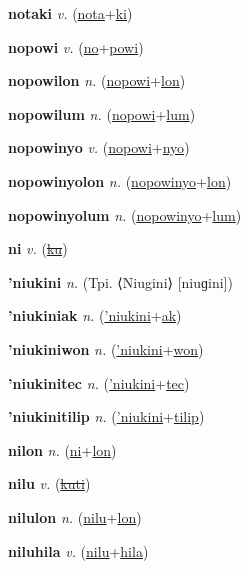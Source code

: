 \textbf{\hypertarget{notaki}{notaki}} \textit{v.} (\hyperlink{nota}{nota}+\allowbreak \hyperlink{ki}{ki})


\textbf{\hypertarget{nopowi}{nopowi}} \textit{v.} (\hyperlink{no}{no}+\allowbreak \hyperlink{powi}{powi})


\textbf{\hypertarget{nopowilon}{nopowilon}} \textit{n.} (\hyperlink{nopowi}{nopowi}+\allowbreak \hyperlink{lon}{lon})


\textbf{\hypertarget{nopowilum}{nopowilum}} \textit{n.} (\hyperlink{nopowi}{nopowi}+\allowbreak \hyperlink{lum}{lum})


\textbf{\hypertarget{nopowinyo}{nopowinyo}} \textit{v.} (\hyperlink{nopowi}{nopowi}+\allowbreak \hyperlink{nyo}{nyo})


\textbf{\hypertarget{nopowinyolon}{nopowinyolon}} \textit{n.} (\hyperlink{nopowinyo}{nopowinyo}+\allowbreak \hyperlink{lon}{lon})


\textbf{\hypertarget{nopowinyolum}{nopowinyolum}} \textit{n.} (\hyperlink{nopowinyo}{nopowinyo}+\allowbreak \hyperlink{lum}{lum})


\textbf{\hypertarget{ni}{ni}} \textit{v.} (\hyperlink{ku}{\sout{ku}})


\textbf{\hypertarget{'niukini}{'niukini}} \textit{n.} (Tpi. ⟨Niugini⟩ [niuɡini])


\textbf{\hypertarget{'niukiniak}{'niukiniak}} \textit{n.} (\hyperlink{'niukini}{'niukini}+\allowbreak \hyperlink{ak}{ak})


\textbf{\hypertarget{'niukiniwon}{'niukiniwon}} \textit{n.} (\hyperlink{'niukini}{'niukini}+\allowbreak \hyperlink{won}{won})


\textbf{\hypertarget{'niukinitec}{'niukinitec}} \textit{n.} (\hyperlink{'niukini}{'niukini}+\allowbreak \hyperlink{tec}{tec})


\textbf{\hypertarget{'niukinitilip}{'niukinitilip}} \textit{n.} (\hyperlink{'niukini}{'niukini}+\allowbreak \hyperlink{tilip}{tilip})


\textbf{\hypertarget{nilon}{nilon}} \textit{n.} (\hyperlink{ni}{ni}+\allowbreak \hyperlink{lon}{lon})


\textbf{\hypertarget{nilu}{nilu}} \textit{v.} (\hyperlink{kuti}{\sout{kuti}})


\textbf{\hypertarget{nilulon}{nilulon}} \textit{n.} (\hyperlink{nilu}{nilu}+\allowbreak \hyperlink{lon}{lon})


\textbf{\hypertarget{niluhila}{niluhila}} \textit{v.} (\hyperlink{nilu}{nilu}+\allowbreak \hyperlink{hila}{hila})


